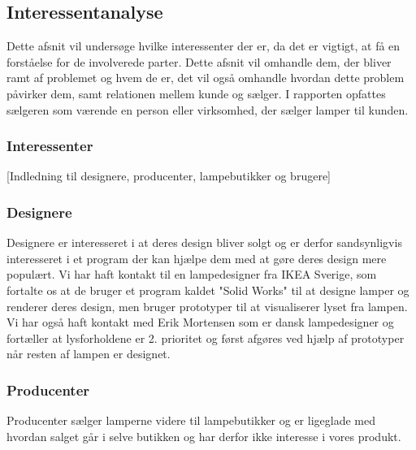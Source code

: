 \subsection{Interessentanalyse}
Dette afsnit vil undersøge hvilke interessenter der er, da det er vigtigt, at få en forståelse for de involverede parter. Dette afsnit vil omhandle dem, der bliver ramt af problemet og hvem de er, det vil også omhandle hvordan dette problem påvirker dem, samt relationen mellem kunde og sælger. I rapporten opfattes sælgeren som værende en person eller virksomhed, der sælger lamper til kunden. 

\subsubsection{Interessenter}


[Indledning til designere, producenter, lampebutikker og brugere]


\subsubsection{Designere}
Designere er interesseret i at deres design bliver solgt og er derfor sandsynligvis interesseret i et program der kan hjælpe dem med at gøre deres design mere populært.
Vi har haft kontakt til en lampedesigner fra IKEA Sverige, som fortalte os at de bruger et program kaldet "Solid Works"\cite{SolidWorks} til at designe lamper og renderer deres design, men bruger prototyper til at visualiserer lyset fra lampen\cite{sec:mailDavid}.
Vi har også haft kontakt med Erik Mortensen som er dansk lampedesigner og fortæller at lysforholdene er 2. prioritet og først afgøres ved hjælp af prototyper når resten af lampen er designet\cite{sec:mailErik}.

\subsubsection{Producenter}
Producenter sælger lamperne videre til lampebutikker og er ligeglade med hvordan salget går i selve butikken og har derfor ikke interesse i vores produkt.

